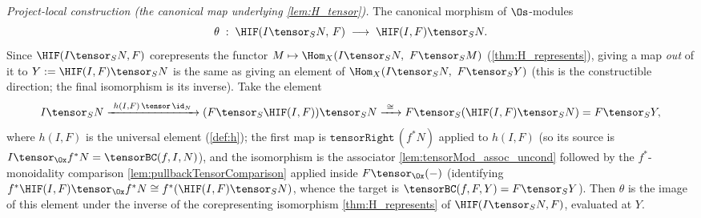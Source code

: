 \begin{definition}

  \label{def:htensorComparison}
  \textit{Project-local construction (the canonical map underlying \cref{lem:H_tensor}).}
  The canonical morphism of $\Os$-modules
  \[
    \theta \;:\; \HIF(I \tensor_S N,\, F) \;\longrightarrow\; \HIF(I,F) \tensor_S N .
  \]
  Since $\HIF(I \tensor_S N, F)$ corepresents the functor
  $M \mapsto \Hom_X(I \tensor_S N,\ F \tensor_S M)$ (\cref{thm:H_represents}), giving a map
  \emph{out} of it to $Y := \HIF(I,F) \tensor_S N$ is the same as giving an element of
  $\Hom_X(I \tensor_S N,\ F \tensor_S Y)$ (this is the constructible direction; the final
  isomorphism is its inverse). Take the element
  \[
    I \tensor_S N
      \xrightarrow{\ h(I,F)\,\tensor\,\id_N\ } (F \tensor_S \HIF(I,F)) \tensor_S N
      \xrightarrow{\ \cong\ } F \tensor_S (\HIF(I,F) \tensor_S N) = F \tensor_S Y ,
  \]
  where $h(I,F)$ is the universal element (\cref{def:h}); the first map is
  $\texttt{tensorRight}\,(f^* N)$ applied to $h(I,F)$ (so its source is
  $I \tensor_{\Ox} f^* N = \tensorBC(f, I, N)$), and the isomorphism is the associator
  \cref{lem:tensorMod_assoc_uncond} followed by the $f^*$-monoidality comparison
  \cref{lem:pullbackTensorComparison} applied inside $F \tensor_{\Ox} (-)$ (identifying
  $f^*\HIF(I,F) \tensor_{\Ox} f^* N \cong f^*(\HIF(I,F) \tensor_S N)$, whence the target is
  $\tensorBC(f, F, Y) = F \tensor_S Y$). Then $\theta$ is the image of this element under the
  inverse of the corepresenting isomorphism \cref{thm:H_represents} of $\HIF(I \tensor_S N, F)$,
  evaluated at $Y$.
\end{definition}


